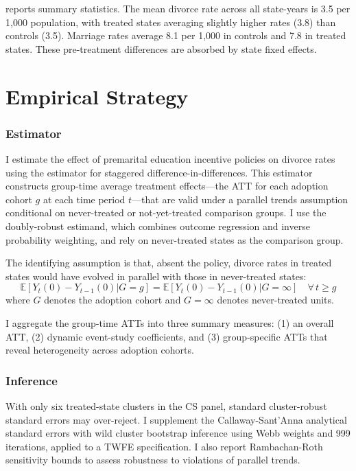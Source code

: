 \documentclass[12pt]{article}
\newcommand{\E}{\mathbb{E}}
\begin{document}


 reports summary statistics. The mean divorce rate across all state-years is 3.5 per 1,000 population, with treated states averaging slightly higher rates (3.8) than controls (3.5). Marriage rates average 8.1 per 1,000 in controls and 7.8 in treated states. These pre-treatment differences are absorbed by state fixed effects.


\section{Empirical Strategy}
\label{sec:strategy}

\subsubsection*{Estimator} I estimate the effect of premarital education incentive policies on divorce rates using the \citet{callaway2021difference} estimator for staggered difference-in-differences. This estimator constructs group-time average treatment effects---the ATT for each adoption cohort $g$ at each time period $t$---that are valid under a parallel trends assumption conditional on never-treated or not-yet-treated comparison groups. I use the doubly-robust estimand, which combines outcome regression and inverse probability weighting, and rely on never-treated states as the comparison group.

The identifying assumption is that, absent the policy, divorce rates in treated states would have evolved in parallel with those in never-treated states:
\begin{equation}
\E[Y_{t}(0) - Y_{t-1}(0) | G = g] = \E[Y_{t}(0) - Y_{t-1}(0) | G = \infty] \quad \forall \, t \geq g
\end{equation}
where $G$ denotes the adoption cohort and $G = \infty$ denotes never-treated units.

I aggregate the group-time ATTs into three summary measures: (1) an overall ATT, (2) dynamic event-study coefficients, and (3) group-specific ATTs that reveal heterogeneity across adoption cohorts.

\subsubsection*{Inference} With only six treated-state clusters in the CS panel, standard cluster-robust standard errors may over-reject. I supplement the Callaway-Sant'Anna analytical standard errors with wild cluster bootstrap inference \citep{cameron2008bootstrap} using Webb weights and 999 iterations, applied to a TWFE specification. I also report Rambachan-Roth sensitivity bounds \citep{rambachan2023more} to assess robustness to violations of parallel trends.
\end{document}
